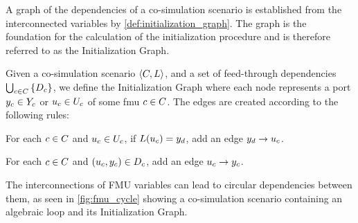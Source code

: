 A graph of the dependencies of a co-simulation scenario is established from the interconnected variables by \cref{def:initialization_graph}. The graph is the foundation for the calculation of the initialization procedure and is therefore referred to as the Initialization Graph.

\begin{definition}\label{def:initialization_graph}
  Given a co-simulation scenario $ \left\langle C, L \right\rangle $, and a set of feed-through dependencies $\bigcup_{c \in C}  \left\{ D_{c} \right\}$, we define the Initialization Graph where each node represents a port $y_{c} \in Y_{c}$ or $u_{c} \in U_{c}$ of some fmu $c \in C$. The edges are created according to the following rules:
  \begin{compactenum}
    \item For each $c \in C$ and $u_{c} \in U_{c}$, if $L(u_{c}) = y_{d}$, add an edge $y_{d} -> u_{c}$.
    \item For each $c \in C$ and $(u_{c},y_{c}) \in D_{c}$, add an edge $u_{c} -> y_{c}$.
  \end{compactenum}
\end{definition}

The interconnections of FMU variables can lead to circular dependencies between them, as seen in \cref{fig:fmu_cycle} showing a co-simulation scenario containing an algebraic loop and its Initialization Graph.

